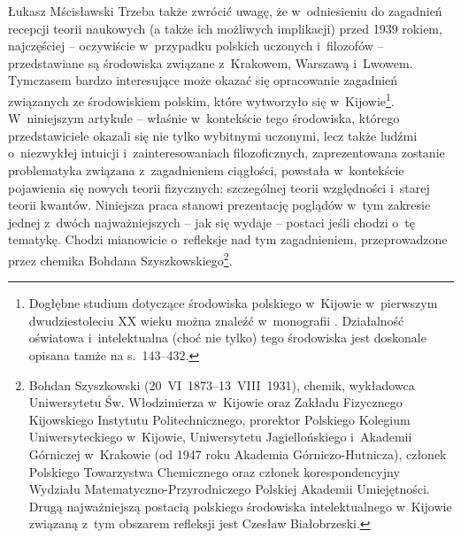 \begin{artplenv}{Łukasz Mścisławski}
Trzeba także zwrócić uwagę, że w~odniesieniu do zagadnień recepcji teorii naukowych (a także ich możliwych implikacji) przed 1939 rokiem, najczęściej -- oczywiście w~przypadku polskich uczonych i~filozofów -- przedstawiane są środowiska związane z~Krakowem, Warszawą i~Lwowem. Tymczasem bardzo interesujące może okazać się opracowanie zagadnień związanych ze środowiskiem polskim, które wytworzyło się w~Kijowie\footnote{Dogłębne studium dotyczące środowiska polskiego w~Kijowie w~pierwszym dwudziestoleciu XX wieku można znaleźć w~monografii
\parencite[][]{korzeniowski_za_2009}. %
 Działalność oświatowa i~intelektualna (choć nie tylko) tego środowiska jest doskonale opisana tamże na s.~143--432.}. W~niniejszym artykule -- właśnie w~kontekście tego środowiska, którego przedstawiciele okazali się nie tylko wybitnymi uczonymi, lecz także ludźmi o~niezwykłej intuicji i~zainteresowaniach filozoficznych, zaprezentowana zostanie problematyka związana z~zagadnieniem ciągłości, powstała w~kontekście pojawienia się nowych teorii fizycznych: szczególnej teorii względności i~starej teorii kwantów. Niniejsza praca stanowi prezentację poglądów w~tym zakresie jednej z~dwóch najważniejszych -- jak się wydaje -- postaci jeśli chodzi o~tę tematykę. Chodzi mianowicie o~refleksje nad tym zagadnieniem, przeprowadzone przez chemika Bohdana Szyszkowskiego\footnote{Bohdan Szyszkowski (20~VI~1873–13~VIII~1931), chemik, wykładowca Uniwersytetu Św. Włodzimierza w~Kijowie oraz Zakładu Fizycznego Kijowskiego Instytutu Politechnicznego, prorektor Polskiego Kolegium Uniwersyteckiego w~Kijowie, Uniwersytetu Jagiellońskiego i~Akademii Górniczej w~Krakowie (od 1947 roku Akademia Górniczo-Hutnicza), członek Polskiego Towarzystwa Chemicznego oraz członek korespondencyjny Wydziału Matematyczno-Przyrodniczego Polskiej Akademii Umiejętności. Drugą najważniejszą postacią polskiego środowiska intelektualnego w~Kijowie związaną z~tym obszarem refleksji jest Czesław Białobrzeski.}.


\end{artplenv}

